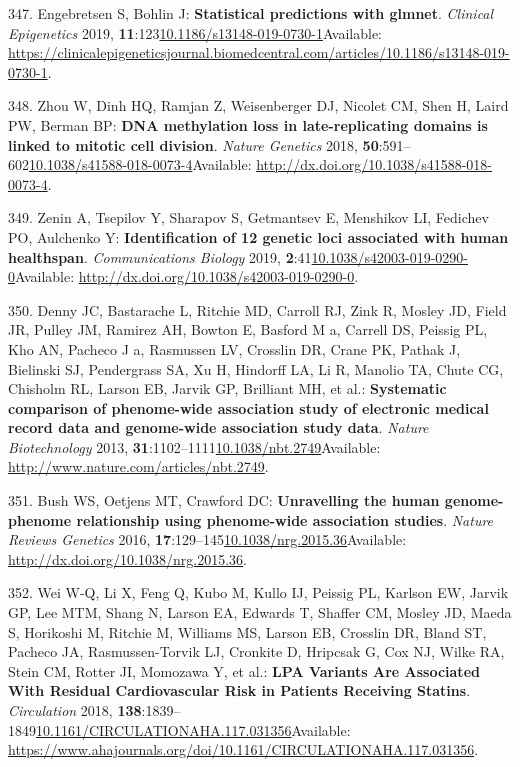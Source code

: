 \documentclass[
]{book}
\begin{document}
\leavevmode\hypertarget{ref-Engebretsen2019}{}%
347. Engebretsen S, Bohlin J: \textbf{Statistical predictions with glmnet}. \emph{Clinical Epigenetics} 2019, \textbf{11}:123\href{https://doi.org/10.1186/s13148-019-0730-1}{10.1186/s13148-019-0730-1}Available: \url{https://clinicalepigeneticsjournal.biomedcentral.com/articles/10.1186/s13148-019-0730-1}.

\leavevmode\hypertarget{ref-Zhou2018}{}%
348. Zhou W, Dinh HQ, Ramjan Z, Weisenberger DJ, Nicolet CM, Shen H, Laird PW, Berman BP: \textbf{DNA methylation loss in late-replicating domains is linked to mitotic cell division}. \emph{Nature Genetics} 2018, \textbf{50}:591--602\href{https://doi.org/10.1038/s41588-018-0073-4}{10.1038/s41588-018-0073-4}Available: \url{http://dx.doi.org/10.1038/s41588-018-0073-4}.

\leavevmode\hypertarget{ref-Zenin2019}{}%
349. Zenin A, Tsepilov Y, Sharapov S, Getmantsev E, Menshikov LI, Fedichev PO, Aulchenko Y: \textbf{Identification of 12 genetic loci associated with human healthspan}. \emph{Communications Biology} 2019, \textbf{2}:41\href{https://doi.org/10.1038/s42003-019-0290-0}{10.1038/s42003-019-0290-0}Available: \url{http://dx.doi.org/10.1038/s42003-019-0290-0}.

\leavevmode\hypertarget{ref-Denny2014}{}%
350. Denny JC, Bastarache L, Ritchie MD, Carroll RJ, Zink R, Mosley JD, Field JR, Pulley JM, Ramirez AH, Bowton E, Basford M a, Carrell DS, Peissig PL, Kho AN, Pacheco J a, Rasmussen LV, Crosslin DR, Crane PK, Pathak J, Bielinski SJ, Pendergrass SA, Xu H, Hindorff LA, Li R, Manolio TA, Chute CG, Chisholm RL, Larson EB, Jarvik GP, Brilliant MH, et al.: \textbf{Systematic comparison of phenome-wide association study of electronic medical record data and genome-wide association study data}. \emph{Nature Biotechnology} 2013, \textbf{31}:1102--1111\href{https://doi.org/10.1038/nbt.2749}{10.1038/nbt.2749}Available: \url{http://www.nature.com/articles/nbt.2749}.

\leavevmode\hypertarget{ref-Bush2016}{}%
351. Bush WS, Oetjens MT, Crawford DC: \textbf{Unravelling the human genome-phenome relationship using phenome-wide association studies}. \emph{Nature Reviews Genetics} 2016, \textbf{17}:129--145\href{https://doi.org/10.1038/nrg.2015.36}{10.1038/nrg.2015.36}Available: \url{http://dx.doi.org/10.1038/nrg.2015.36}.

\leavevmode\hypertarget{ref-Wei2018}{}%
352. Wei W-Q, Li X, Feng Q, Kubo M, Kullo IJ, Peissig PL, Karlson EW, Jarvik GP, Lee MTM, Shang N, Larson EA, Edwards T, Shaffer CM, Mosley JD, Maeda S, Horikoshi M, Ritchie M, Williams MS, Larson EB, Crosslin DR, Bland ST, Pacheco JA, Rasmussen-Torvik LJ, Cronkite D, Hripcsak G, Cox NJ, Wilke RA, Stein CM, Rotter JI, Momozawa Y, et al.: \textbf{LPA Variants Are Associated With Residual Cardiovascular Risk in Patients Receiving Statins}. \emph{Circulation} 2018, \textbf{138}:1839--1849\href{https://doi.org/10.1161/CIRCULATIONAHA.117.031356}{10.1161/CIRCULATIONAHA.117.031356}Available: \url{https://www.ahajournals.org/doi/10.1161/CIRCULATIONAHA.117.031356}.
\end{document}
